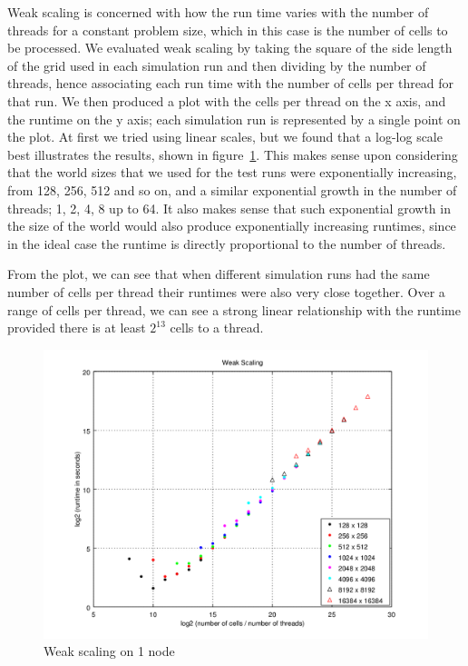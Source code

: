 \documentclass[a4paper]{article}
\begin{document}
Weak scaling is concerned with how the run time varies with the number of threads for a constant problem size, which in this case is the number of cells to be processed.
We evaluated weak scaling by taking the square of the side length of the grid used in each simulation run and then dividing by the number of threads, hence associating each run time with the number of cells per thread for that run.
We then produced a plot with the cells per thread on the x axis, and the runtime on the y axis; each simulation run is represented by a single point on the plot.
At first we tried using linear scales, but we found that a log-log scale best illustrates the results, shown in figure~\ref{weakscaling}.
This makes sense upon considering that the world sizes that we used for the test runs were exponentially increasing, from 128, 256, 512 and so on, and a similar exponential growth in the number of threads; 1, 2, 4, 8 up to 64.
It also makes sense that such exponential growth in the size of the world would also produce exponentially increasing runtimes, since in the ideal case the runtime is directly proportional to the number of threads.

From the plot, we can see that when different simulation runs had the same number of cells per thread their runtimes were also very close together.
Over a range of cells per thread, we can see a strong linear relationship with the runtime provided there is at least $2^{13}$ cells to a thread.

\begin{figure}
    \centering
    \includegraphics[width=\textwidth]{weak-scaling}
    \caption{Weak scaling on 1 node}
	\label{weakscaling}
\end{figure}
\end{document}
